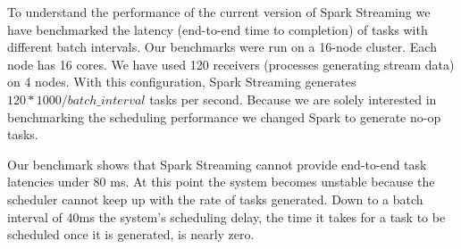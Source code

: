 To understand the performance of the current version of Spark Streaming we have benchmarked the latency (end-to-end time to completion) of tasks with different batch intervals. 
Our benchmarks were run on a 16-node cluster. Each node has 16 cores. We have used 120 receivers (processes generating stream data) on 4 nodes. 
With this configuration, Spark Streaming generates $120*1000/batch\_interval$ tasks per second.
Because we are solely interested in benchmarking the scheduling performance we changed Spark to generate no-op tasks.

Our benchmark shows that Spark Streaming cannot provide end-to-end task latencies under 80 ms. At this point the system becomes unstable because the scheduler cannot keep up with the rate of tasks generated. Down to a batch interval of 40ms the system's scheduling delay, the time it takes for a task to be scheduled once it is generated, is nearly zero.

